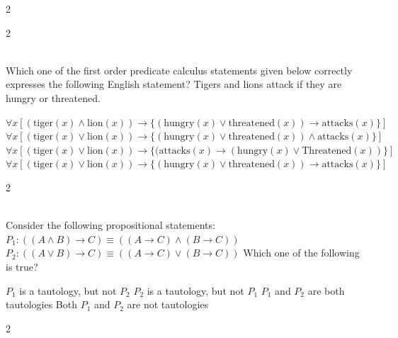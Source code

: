 \documentclass[12pt]{exam}
\begin{document}
\begin{questions}
\begin{multicols*}{2}
\end{multicols*}
\vspace{0.6cm}
\newpage
\begin{multicols*}{2}

 \\[0.2cm]
{\Large Which one of the first order predicate calculus statements given below correctly expresses the following English statement?\newline
Tigers and lions attack if they are hungry or threatened.}
\begin{choices}
  \choice $\forall x [(\text{tiger} (x) \wedge \text{lion} (x)) \to \{(\text{hungry} (x) \vee \text{threatened} (x)) \to \text{attacks} (x)\}]$
  \choice $\forall x [(\text{tiger} (x) \vee \text{lion} (x)) \to \{(\text{hungry} (x) \vee \text{threatened} (x)) \wedge \text{attacks} (x)\}]$
  \choice $\forall x [(\text{tiger} (x) \vee \text{lion} (x)) \to \{(\text{attacks} (x) \to (\text{hungry} (x) \vee \text{Threatened} (x))\}]$
  \choice $\forall x [(\text{tiger} (x) \vee \text{lion} (x)) \to \{(\text{hungry} (x) \vee \text{threatened} (x)) \to \text{attacks} (x)\}]$
\end{choices}

\end{multicols*}
\vspace{0.6cm}
\newpage
\begin{multicols*}{2}

 \\[0.2cm]
{\Large Consider the following propositional statements: \newline
$P_1 : ((A \wedge B) \to C) \equiv ((A \to C) \wedge (B \to C))$\newline
$P_2 : ((A \vee B) \to C) \equiv ((A \to C) \vee (B \to C))$ \newline
Which one of the following is true?}
\begin{choices}
  \choice $P_1$ is a tautology, but not $P_2$
  \choice $P_2$ is a tautology, but not $P_1$
  \choice $P_1$ and $P_2$ are both tautologies
  \choice Both $P_1$ and $P_2$ are not tautologies
\end{choices}

\end{multicols*}
\vspace{0.6cm}
\newpage
\begin{multicols*}{2}


\end{multicols*}
\end{questions}
\end{document}
